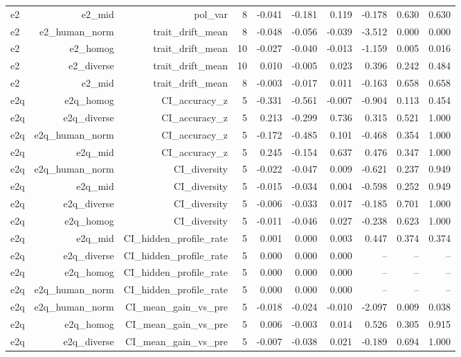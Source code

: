 \documentclass[11pt]{article}
\begin{document}
\begin{landscape}
\begin{longtable}{@{}lrrrrrrrrr@{}}
e2 & e2\_mid & pol\_var & 8 & -0.041 & -0.181 & 0.119 & -0.178 & 0.630 & 0.630 \\
e2 & e2\_human\_norm & trait\_drift\_mean & 8 & -0.048 & -0.056 & -0.039 & -3.512 & 0.000 & 0.000 \\
e2 & e2\_homog & trait\_drift\_mean & 10 & -0.027 & -0.040 & -0.013 & -1.159 & 0.005 & 0.016 \\
e2 & e2\_diverse & trait\_drift\_mean & 10 & 0.010 & -0.005 & 0.023 & 0.396 & 0.242 & 0.484 \\
e2 & e2\_mid & trait\_drift\_mean & 8 & -0.003 & -0.017 & 0.011 & -0.163 & 0.658 & 0.658 \\
e2q & e2q\_homog & CI\_accuracy\_z & 5 & -0.331 & -0.561 & -0.007 & -0.904 & 0.113 & 0.454 \\
e2q & e2q\_diverse & CI\_accuracy\_z & 5 & 0.213 & -0.299 & 0.736 & 0.315 & 0.521 & 1.000 \\
e2q & e2q\_human\_norm & CI\_accuracy\_z & 5 & -0.172 & -0.485 & 0.101 & -0.468 & 0.354 & 1.000 \\
e2q & e2q\_mid & CI\_accuracy\_z & 5 & 0.245 & -0.154 & 0.637 & 0.476 & 0.347 & 1.000 \\
e2q & e2q\_human\_norm & CI\_diversity & 5 & -0.022 & -0.047 & 0.009 & -0.621 & 0.237 & 0.949 \\
e2q & e2q\_mid & CI\_diversity & 5 & -0.015 & -0.034 & 0.004 & -0.598 & 0.252 & 0.949 \\
e2q & e2q\_diverse & CI\_diversity & 5 & -0.006 & -0.033 & 0.017 & -0.185 & 0.701 & 1.000 \\
e2q & e2q\_homog & CI\_diversity & 5 & -0.011 & -0.046 & 0.027 & -0.238 & 0.623 & 1.000 \\
e2q & e2q\_mid & CI\_hidden\_profile\_rate & 5 & 0.001 & 0.000 & 0.003 & 0.447 & 0.374 & 0.374 \\
e2q & e2q\_diverse & CI\_hidden\_profile\_rate & 5 & 0.000 & 0.000 & 0.000 & -- & -- & -- \\
e2q & e2q\_homog & CI\_hidden\_profile\_rate & 5 & 0.000 & 0.000 & 0.000 & -- & -- & -- \\
e2q & e2q\_human\_norm & CI\_hidden\_profile\_rate & 5 & 0.000 & 0.000 & 0.000 & -- & -- & -- \\
e2q & e2q\_human\_norm & CI\_mean\_gain\_vs\_pre & 5 & -0.018 & -0.024 & -0.010 & -2.097 & 0.009 & 0.038 \\
e2q & e2q\_homog & CI\_mean\_gain\_vs\_pre & 5 & 0.006 & -0.003 & 0.014 & 0.526 & 0.305 & 0.915 \\
e2q & e2q\_diverse & CI\_mean\_gain\_vs\_pre & 5 & -0.007 & -0.038 & 0.021 & -0.189 & 0.694 & 1.000 \\

\end{longtable}
\end{landscape}
\end{document}

